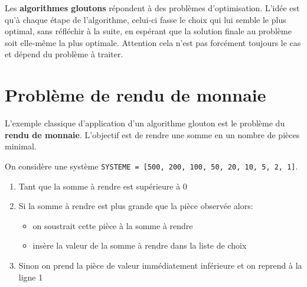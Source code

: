 \def\level{Première}  %
\def\course{NSI}
\def\chaptername{Algorithme Glouton} %
\def\docname{AP09}        %

\pagestyle{cours_FP}
\makeheader{} %

\begin{propriete}{}
Les \textbf{algorithmes gloutons} répondent à des problèmes d'optimisation. L'idée est qu'à chaque étape de l'algorithme, celui-ci fasse le choix qui lui semble le plus optimal, sans réfléchir à la suite, en espérant que la solution finale au problème soit elle-même la plus optimale. Attention cela n'est pas forcément toujours le cas et dépend du problème à traiter.
\end{propriete}

\section{Problème de rendu de monnaie}

L'exemple classique d'application d'un algorithme glouton est le problème du \textbf{rendu de monnaie}. L'objectif est de rendre une somme en un nombre de pièces minimal.
\medskip

\begin{exemple}{}
On considère une système \verb+SYSTEME = [500, 200, 100, 50, 20, 10, 5, 2, 1]+. 

\begin{enumerate}
	\item Tant que la somme à rendre est supérieure à 0
	\item Si la somme à rendre est plus grande que la pièce observée alors:
	\begin{itemize}
		\item on soustrait cette pièce à la somme à rendre
		\item insère la valeur de la somme à rendre dans la liste de choix
		
	\end{itemize}
	\item Sinon on prend la pièce de valeur immédiatement inférieure et on reprend à la ligne 1
\end{enumerate}
\end{exemple}

